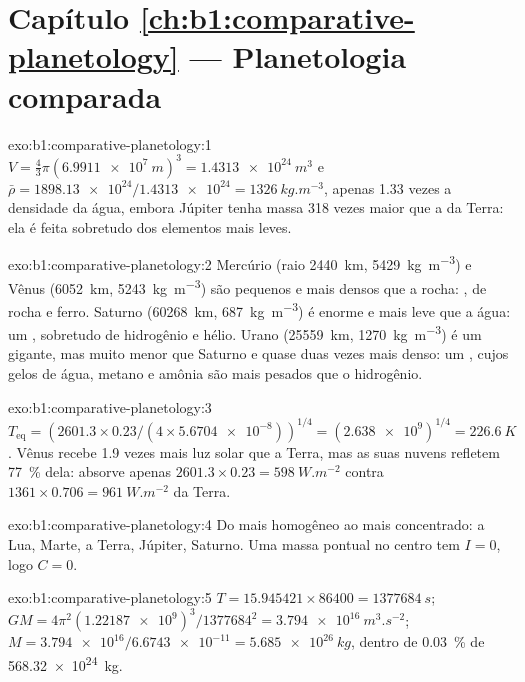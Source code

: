 \section*{Capítulo \ref{ch:b1:comparative-planetology} --- Planetologia comparada}

\begin{solution}{exo:b1:comparative-planetology:1}
$V = \tfrac43\pi(\qty{6.9911e7}{m})^3 = \qty{1.4313e24}{m^3}$ e
$\bar\rho = \num{1898.13e24}/\num{1.4313e24} = \qty{1326}{kg.m^{-3}}$, apenas
1.33 vezes a densidade da água, embora Júpiter tenha massa 318 vezes maior que
a da Terra: ela é feita sobretudo dos elementos mais leves.
\end{solution}

\begin{solution}{exo:b1:comparative-planetology:2}
Mercúrio (raio \qty{2440}{km}, \qty{5429}{kg.m^{-3}}) e Vênus
(\qty{6052}{km}, \qty{5243}{kg.m^{-3}}) são pequenos e mais densos que a rocha:
, de rocha e ferro. Saturno (\qty{60268}{km},
\qty{687}{kg.m^{-3}}) é enorme e mais leve que a água: um , sobretudo
de hidrogênio e hélio. Urano (\qty{25559}{km}, \qty{1270}{kg.m^{-3}}) é um gigante,
mas muito menor que Saturno e quase duas vezes mais denso: um ,
cujos gelos de água, metano e amônia são mais pesados que o hidrogênio.
\end{solution}

\begin{solution}{exo:b1:comparative-planetology:3}
$T_\mathrm{eq} = (2601.3\times0.23/(4\times\num{5.6704e-8}))^{1/4} =
(\num{2.638e9})^{1/4} = \qty{226.6}{K}$. Vênus recebe 1.9 vezes mais luz solar
que a Terra, mas as suas nuvens refletem \qty{77}{\percent} dela: absorve apenas
$2601.3\times0.23 = \qty{598}{W.m^{-2}}$ contra
$1361\times0.706 = \qty{961}{W.m^{-2}}$ da Terra.
\end{solution}

\begin{solution}{exo:b1:comparative-planetology:4}
Do mais homogêneo ao mais concentrado: a Lua, Marte, a Terra, Júpiter, Saturno. Uma massa pontual no centro tem $I = 0$, logo $C = 0$.
\end{solution}

\begin{solution}{exo:b1:comparative-planetology:5}
$T = 15.945421\times86400 = \qty{1377684}{s}$;
$GM = 4\pi^2(\num{1.22187e9})^3/\num{1377684}^2 = \qty{3.794e16}{m^3.s^{-2}}$;
$M = \num{3.794e16}/\num{6.6743e-11} = \qty{5.685e26}{kg}$, dentro de
\qty{0.03}{\percent} de \qty{568.32e24}{kg}.
\end{solution}

